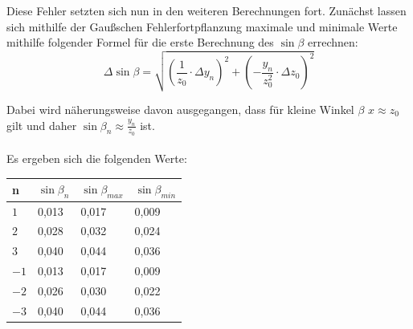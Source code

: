 \documentclass[12pt,a4paper,titlepage,headinclude,bibtotoc]{scrartcl}
\begin{document}
Diese Fehler setzten sich nun in den weiteren Berechnungen fort. Zunächst lassen sich mithilfe der Gaußschen Fehlerfortpflanzung maximale und minimale Werte mithilfe folgender Formel für die erste Berechnung des $\sin \beta$ errechnen:\\

\begin{equation}
\Delta \sin \beta = \sqrt{ \left( \dfrac{1}{z_0} \cdot \Delta y_n \right)^2 + \left(- \dfrac{y_n}{z_0^2} \cdot \Delta z_0\right)^2 } 
\end{equation}

Dabei wird näherungsweise davon ausgegangen, dass für kleine Winkel $\beta$  $x \approx z_0$ gilt und daher $\sin \beta_n \approx \frac{y_n}{z_0}$ ist.\\\\

\newpage
Es ergeben sich die folgenden Werte: \\


\begin{table} [h]
\centering
\begin{tabular}{|p{2 cm}||p{3 cm}|p{3 cm}|p{3 cm}|}
		\hline
         n & $\sin\beta_n$  & $\sin\beta_{max} $ & $\sin\beta_{min}$ \\
         \hline 
         $1 $& 0,013& 0,017 & 0,009 \\
         \hline
         $2 $& 0,028&  0,032 &0,024 \\
         \hline
         $3 $& 0,040& 0,044& 0,036\\
         \hline
         $-1$& 0,013&  0,017& 0,009 \\
         \hline
         $-2$& 0,026& 0,030 & 0,022 \\
         \hline             
         $-3$& 0,040& 0,044  & 0,036 \\
         \hline
\end{tabular}
\end{table}
\end{document}
